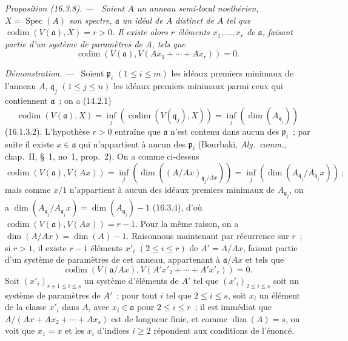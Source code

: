\documentclass[10pt,oneside]{book}
\makeatletter
\newcommand{\setmanualcurrentlabel}[1]{\def\@currentlabel{#1}}
\newcommand{\oldpage}[2][]{%
  \setcounter{footnote}{0}%
  \marginpar{\scriptsize\textbf{#1}~|~#2}\ignorespaces}
\newenvironment{proposition}[1][]{%
  \setmanualcurrentlabel{#1}\par\medskip\noindent\itshape Proposition (#1). ---\ }{\par}
\newenvironment{proof}{%
  \par\medskip\noindent\textit{Démonstration. ---\ }}{\par}
\makeatother
\begin{document}
\oldpage[0\textsubscript{IV-1}]{31}

\begin{proposition}[16.3.8]
\label{0.16.3.8-fr}
Soient $A$ un anneau semi-local noethérien, $X=\operatorname{Spec}(A)$ son
spectre, $\mathfrak{a}$ un idéal de $A$ distinct de $A$ tel que
$\operatorname{codim}(V(\mathfrak{a}),X)=r>0$. Il existe alors $r$ éléments
$x_1,\ldots,x_r$ de $\mathfrak{a}$, faisant partie d'un système de paramètres
de $A$, tels que
\[
  \operatorname{codim}(V(\mathfrak{a}),
  V(Ax_1+\cdots+Ax_r))=0.
\]
\end{proposition}

\begin{proof}
Soient $\mathfrak{p}_i$ $(1\leq i\leq m)$ les idéaux premiers minimaux de
l'anneau $A$, $\mathfrak{q}_j$ $(1\leq j\leq n)$ les idéaux premiers minimaux
parmi ceux qui contiennent $\mathfrak{a}$~; on a (14.2.1)
\[
  \operatorname{codim}(V(\mathfrak{a}),X)
  =\inf_j(\operatorname{codim}(V(\mathfrak{q}_j),X))
  =\inf_j(\dim(A_{\mathfrak{q}_j}))
\]
(16.1.3.2). L'hypothèse $r>0$ entraîne que $\mathfrak{a}$ n'est contenu dans
aucun des $\mathfrak{p}_i$~; par suite il existe $x\in\mathfrak{a}$ qui
n'appartient à aucun des $\mathfrak{p}_i$ (Bourbaki, \emph{Alg.~comm.},
chap.~II, \S~1, no~1, prop.~2). On a comme ci-dessus
\[
  \operatorname{codim}(V(\mathfrak{a}),V(Ax))
  =\inf_j(\dim((A/Ax)_{\mathfrak{q}_j/Ax}))
  =\inf_j(\dim(A_{\mathfrak{q}_j}/A_{\mathfrak{q}_j}x))~;
\]
mais comme $x/1$ n'appartient à aucun des idéaux premiers minimaux de
$A_{\mathfrak{q}_j}$, on a
$\dim(A_{\mathfrak{q}_j}/A_{\mathfrak{q}_j}x)
=\dim(A_{\mathfrak{q}_j})-1$ (16.3.4), d'où
$\operatorname{codim}(V(\mathfrak{a}),V(Ax))=r-1$. Pour la même raison, on a
$\dim(A/Ax)=\dim(A)-1$. Raisonnons maintenant par récurrence sur $r$~; si
$r>1$, il existe $r-1$ éléments $x'_i$ $(2\leq i\leq r)$ de $A'=A/Ax$,
faisant partie d'un système de paramètres de cet anneau, appartenant à
$\mathfrak{a}/Ax$ et tels que
\[
  \operatorname{codim}(V(\mathfrak{a}/Ax),
  V(A'x'_2+\cdots+A'x'_r))=0.
\]
Soit $(x'_i)_{r+1\leq i\leq s}$ un système d'éléments de $A'$ tel que
$(x'_i)_{2\leq i\leq s}$ soit un système de paramètres de $A'$~; pour tout
$i$ tel que $2\leq i\leq s$, soit $x_i$ un élément de la classe $x'_i$ dans
$A$, avec $x_i\in\mathfrak{a}$ pour $2\leq i\leq r$~; il est immédiat que
$A/(Ax+Ax_2+\cdots+Ax_s)$ est de longueur finie, et comme $\dim(A)=s$, on voit
que $x_1=x$ et les $x_i$ d'indices $i\geq2$ répondent aux conditions de
l'énoncé.
\end{proof}
\end{document}
